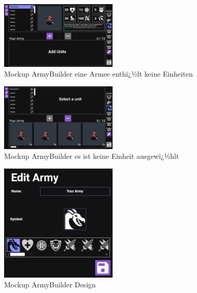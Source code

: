 \documentclass[12pt, titlepage]{scrartcl}
\begin{document}
		\begin{figure}[H] 
			\centering
			\includegraphics[width=0.5\textwidth]{Army_Builder_Add_Units.png}
			\caption{Mockup ArmyBuilder eine Armee enthï¿½lt keine Einheiten}
			\label{ArmyBuilder_AddUnits}
		\end{figure}
		\begin{figure}[H] 
			\centering
			\includegraphics[width=0.5\textwidth]{ArmyBuilder_Select_Unit.png}
			\caption{Mockup ArmyBuilder es ist keine Einheit ausgewï¿½hlt}
			\label{ArmyBuilder_Select_Unit}
		\end{figure}
		\begin{figure}[H] 
			\centering
			\includegraphics[width=0.5\textwidth]{ArmyEditor.png}
			\caption{Mockup ArmyBuilder Design}
			\label{AmryEditor}
		\end{figure}
		
\end{document}
